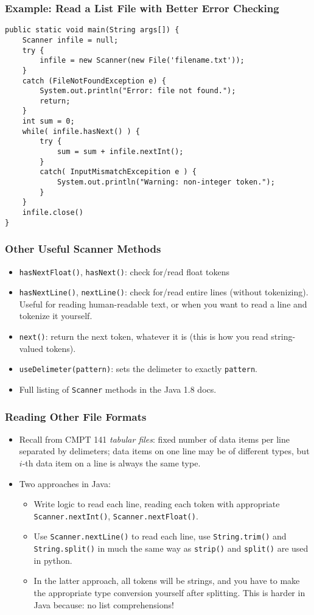 \documentclass[cmptslides]{cmpt280-slidesandsolutions}
\begin{document}
\begin{frame}[fragile]
\frametitle{Example:  Read a List File with Better Error Checking}
\begin{lstlisting}[basicstyle=\tt\tiny,tabsize=4]
public static void main(String args[]) {
	Scanner infile = null;
	try {
		infile = new Scanner(new File('filename.txt'));
	}
	catch (FileNotFoundException e) {
		System.out.println("Error: file not found.");
		return;
	}
	int sum = 0;
	while( infile.hasNext() ) {
		try {
			sum = sum + infile.nextInt();
		}
		catch( InputMismatchExcepition e ) {
			System.out.println("Warning: non-integer token.");
		}
	}
	infile.close()
}	
\end{lstlisting}
\end{frame}

\begin{frame}
\frametitle{Other Useful Scanner Methods}
\begin{itemize}
	\item \lstinline{hasNextFloat()}, \lstinline{hasNext()}: check for/read float tokens
	\item \lstinline{hasNextLine()}, \lstinline{nextLine()}: check for/read entire lines (without tokenizing).  Useful for reading human-readable text, or when you want to read a line and tokenize it yourself.
	\item \lstinline{next()}:  return the next token, whatever it is (this is how you read string-valued tokens).
	\item \lstinline{useDelimeter(pattern)}: sets the delimeter to exactly \lstinline{pattern}.
	\item Full listing of \lstinline{Scanner} methods in the Java 1.8 docs.
\end{itemize}	
\end{frame}

\begin{frame}
\frametitle{Reading Other File Formats}
\begin{itemize}
\item Recall from CMPT 141 \textit{tabular files}: fixed number of data items per line separated by delimeters; data items on one line may be of different types, but $i$-th data item on a line is always the same type.
\item Two approaches in Java:
	\begin{itemize}[topsep=0pt,itemsep=2pt]
	\item Write logic to read each line, reading each token with appropriate \lstinline{Scanner.nextInt()}, \lstinline{Scanner.nextFloat()}.
	\item Use \lstinline{Scanner.nextLine()} to read each line, use \lstinline{String.trim()} and \lstinline{String.split()} in much the same way as \lstinline{strip()} and \lstinline{split()} are used in python.
	\item In the latter approach, all tokens will be strings, and you have to make the appropriate type conversion yourself after splitting.  This is harder in Java because: no list comprehensions!
	\end{itemize}
\end{itemize}
\end{frame}
\end{document}

